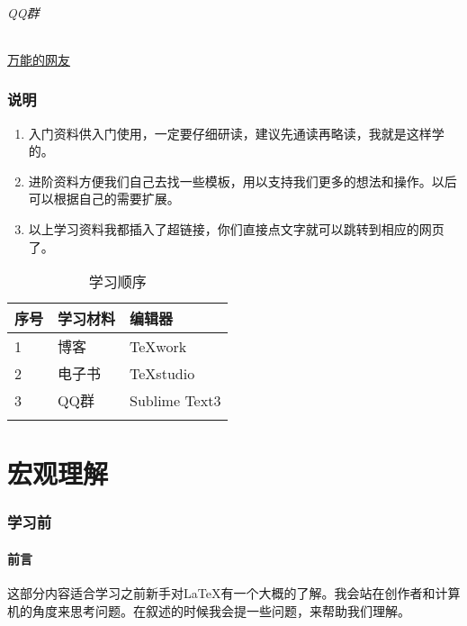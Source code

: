 \documentclass[UTF8,11pt,titlepage,a4paper]{ctexart}
\begin{document}
	\paragraph{QQ群}\href{https://jq.qq.com/?_wv=1027&k=592rjA8}{万能的网友}
	\section{说明}
	\begin{enumerate}
		\item 入门资料供入门使用，一定要仔细研读，建议先通读再略读，我就是这样学的。
		\item 进阶资料方便我们自己去找一些模板，用以支持我们更多的想法和操作。以后可以根据自己的需要扩展。
		\item 以上学习资料我都插入了超链接，你们直接点文字就可以跳转到相应的网页了。
	
	\end{enumerate}
   \begin{table}
   	\centering
   	\begin{tabular}{p{80pt}p{80pt}p{80pt}}
   		\toprule 
   		序号&学习材料&编辑器\\
   		\midrule
   		1&博客&TeXwork\\
   		2&电子书&TeXstudio\\
   		3&QQ群&Sublime Text3\\
   		\bottomrule                                         
   		\caption{学习顺序} 
   		                  
   	\end{tabular}
   \label{marker}
   \end{table}
   \newpage
   \part{宏观理解}
   \section{学习前}
   \subsection{前言}这部分内容适合学习之前新手对LaTeX有一个大概的了解。我会站在创作者和计算机的角度来思考问题。在叙述的时候我会提一些问题，来帮助我们理解。
   \par 
\end{document}

